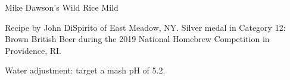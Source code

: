 \begin{recipe}{Mike Dawson's Wild Rice Mild} %

\begin{aboutblock}
Recipe by John DiSpirito of East Meadow, NY. Silver medal in Category 12:
Brown British Beer during the 2019 National Homebrew Competition
in Providence, RI. \sourceaha
\end{aboutblock}


\begin{methodandtiming}
 
\begin{mashsteps}
\end{mashsteps}

\begin{fermentationsteps}
\end{fermentationsteps}

\begin{directions}
Water adjustment: target a mash pH of 5.2.
\end{directions}

\end{methodandtiming}

\recipebreak

\begin{ingredientsblock}

\begin{malts}
\end{malts}

\begin{hops}
\end{hops}


\end{ingredientsblock}

\end{recipe}

